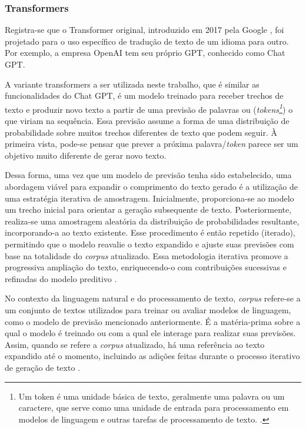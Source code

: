 \documentclass[10pt, conference, compsocconf]{IEEEtran}
\begin{document}
\subsubsection{Transformers}

Registra-se que o Transformer original, introduzido em 2017 pela Google \cite{Attention-Is-All-You-Need}, foi projetado para o uso específico de tradução de texto de um idioma para outro. Por exemplo, a empresa OpenAI tem seu próprio GPT, conhecido como Chat GPT.

A variante  transformers a ser utilizada neste trabalho, que é similar as funcionalidades do Chat GPT, é um modelo treinado para receber trechos de texto e produzir novo texto a partir de uma previsão de palavras ou (\textit{tokens\footnote{Um token é uma unidade básica de texto, geralmente uma palavra ou um caractere, que serve como uma unidade de entrada para processamento em modelos de linguagem e outras tarefas de processamento de texto. \cite{Introduction-to-Information-Retrieval}.}}) o que viriam na sequência. Essa previsão assume a forma de uma distribuição de probabilidade sobre muitos trechos diferentes de texto que podem seguir. À primeira vista, pode-se pensar que prever a próxima palavra/\textit{token} parece ser um objetivo muito diferente de gerar novo texto.

Dessa forma, uma vez que um modelo de previsão tenha sido estabelecido, uma abordagem viável para expandir o comprimento do texto gerado é a utilização de uma estratégia iterativa de amostragem. Inicialmente, proporciona-se ao modelo um trecho inicial para orientar a geração subsequente de texto. Posteriormente, realiza-se uma amostragem aleatória da distribuição de probabilidades resultante, incorporando-a ao texto existente. Esse procedimento é então repetido (iterado), permitindo que o modelo reavalie o texto expandido e ajuste suas previsões com base na totalidade do \textit{corpus} atualizado. Essa metodologia iterativa promove a progressiva ampliação do texto, enriquecendo-o com contribuições sucessivas e refinadas do modelo preditivo \cite{holtzman2019curious}.

No contexto da linguagem natural e do processamento de texto, \textit{corpus} refere-se a um conjunto de textos utilizados para treinar ou avaliar modelos de linguagem, como o modelo de previsão mencionado anteriormente. É a matéria-prima sobre a qual o modelo é treinado ou com a qual ele interage para realizar suas previsões. Assim, quando se refere a \textit{corpus} atualizado, há uma referência ao texto expandido até o momento, incluindo as adições feitas durante o processo iterativo de geração de texto \cite{Foundations-of-Statistical-Natural-Language-Processing}.
\end{document}
